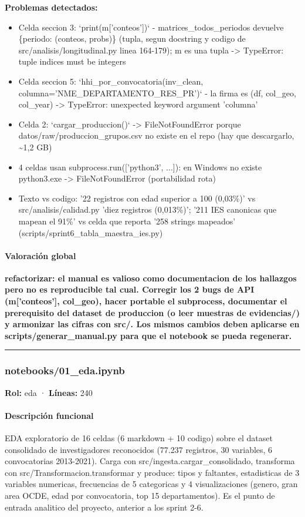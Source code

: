 \begin{tcolorbox}[riesgo]
\textbf{Problemas detectados:}
\begin{itemize}
  \item Celda seccion 3: `print(m['conteos'])` - matrices\_todos\_periodos devuelve \{periodo: (conteos, probs)\} (tupla, segun docstring y codigo de src/analisis/longitudinal.py linea 164-179); m es una tupla -> TypeError: tuple indices must be integers
  \item Celda seccion 5: `hhi\_por\_convocatoria(inv\_clean, columna='NME\_DEPARTAMENTO\_RES\_PR')` - la firma es (df, col\_geo, col\_year) -> TypeError: unexpected keyword argument 'columna'
  \item Celda 2: `cargar\_produccion()` -> FileNotFoundError porque datos/raw/produccion\_grupos.csv no existe en el repo (hay que descargarlo, \textasciitilde{}1,2 GB)
  \item 4 celdas usan subprocess.run(['python3', ...]): en Windows no existe python3.exe -> FileNotFoundError (portabilidad rota)
  \item Texto vs codigo: '22 registros con edad superior a 100 (0,03\%)' vs src/analisis/calidad.py 'diez registros (0,013\%)'; '211 IES canonicas que mapean el 91\%' vs celda que reporta '258 strings mapeados' (scripts/sprint6\_tabla\_maestra\_ies.py)
\end{itemize}
\end{tcolorbox}

\paragraph{Valoración global}
\textbf{refactorizar: el manual es valioso como documentacion de los hallazgos pero no es reproducible tal cual. Corregir los 2 bugs de API (m['conteos'], col\_geo), hacer portable el subprocess, documentar el prerequisito del dataset de produccion (o leer muestras de evidencias/) y armonizar las cifras con src/. Los mismos cambios deben aplicarse en scripts/generar\_manual.py para que el notebook se pueda regenerar.}

\medskip
\hrule

\subsubsection{notebooks/01\_eda.ipynb}
\textbf{Rol:} eda · \textbf{Líneas:} 240

\paragraph{Descripción funcional}
EDA exploratorio de 16 celdas (6 markdown + 10 codigo) sobre el dataset consolidado de investigadores reconocidos (77.237 registros, 30 variables, 6 convocatorias 2013-2021). Carga con src/ingesta.cargar\_consolidado, transforma con src/Transformacion.transformar y produce: tipos y faltantes, estadisticas de 3 variables numericas, frecuencias de 5 categoricas y 4 visualizaciones (genero, gran area OCDE, edad por convocatoria, top 15 departamentos). Es el punto de entrada analitico del proyecto, anterior a los sprint 2-6.

